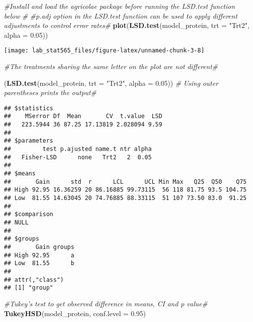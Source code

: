 \documentclass[]{article}
\newenvironment{Shaded}{\begin{snugshade}}{\end{snugshade}}
\newcommand{\CommentTok}[1]{\textcolor[rgb]{0.56,0.35,0.01}{\textit{#1}}}
\newcommand{\DataTypeTok}[1]{\textcolor[rgb]{0.13,0.29,0.53}{#1}}
\newcommand{\FloatTok}[1]{\textcolor[rgb]{0.00,0.00,0.81}{#1}}
\newcommand{\KeywordTok}[1]{\textcolor[rgb]{0.13,0.29,0.53}{\textbf{#1}}}
\newcommand{\NormalTok}[1]{#1}
\newcommand{\StringTok}[1]{\textcolor[rgb]{0.31,0.60,0.02}{#1}}
\begin{document}
\begin{Shaded}
\begin{Highlighting}[]
\CommentTok{#Install and load the agricolae package before running the LSD.test function below #}
\CommentTok{#p.adj option in the LSD.test function can be used to apply different adjustments to control error rates#}
\KeywordTok{plot}\NormalTok{(}\KeywordTok{LSD.test}\NormalTok{(model_protein, }\DataTypeTok{trt =} \StringTok{"Trt2"}\NormalTok{, }\DataTypeTok{alpha =} \FloatTok{0.05}\NormalTok{))}
\end{Highlighting}
\end{Shaded}

\texttt{[image: lab\_stat565\_files/figure-latex/unnamed-chunk-3-8]}

\begin{Shaded}
\begin{Highlighting}[]
\CommentTok{#The treatments sharing the same letter on the plot are not different#}

\NormalTok{(}\KeywordTok{LSD.test}\NormalTok{(model_protein, }\DataTypeTok{trt =} \StringTok{"Trt2"}\NormalTok{, }\DataTypeTok{alpha =} \FloatTok{0.05}\NormalTok{)) }\CommentTok{# Using outer parentheses prints the output#}
\end{Highlighting}
\end{Shaded}

\begin{verbatim}
## $statistics
##    MSerror Df  Mean       CV  t.value  LSD
##   223.5944 36 87.25 17.13819 2.028094 9.59
## 
## $parameters
##         test p.ajusted name.t ntr alpha
##   Fisher-LSD      none   Trt2   2  0.05
## 
## $means
##       Gain      std  r      LCL      UCL Min Max   Q25  Q50    Q75
## High 92.95 16.36259 20 86.16885 99.73115  56 118 81.75 93.5 104.75
## Low  81.55 14.63045 20 74.76885 88.33115  51 107 73.50 83.0  91.25
## 
## $comparison
## NULL
## 
## $groups
##       Gain groups
## High 92.95      a
## Low  81.55      b
## 
## attr(,"class")
## [1] "group"
\end{verbatim}

\begin{Shaded}
\begin{Highlighting}[]
\CommentTok{#Tukey's test to get observed difference in means, CI and p value#}
\KeywordTok{TukeyHSD}\NormalTok{(model_protein, }\DataTypeTok{conf.level =} \FloatTok{0.95}\NormalTok{)}
\end{Highlighting}
\end{Shaded}
\end{document}
